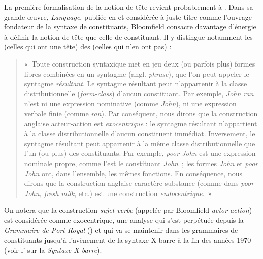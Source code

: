 {    La première formalisation de la notion de tête revient probablement à . Dans sa grande œuvre, \textit{Language}, publiée en \citeyear{bloomfield1933language} et considérée à juste titre comme l’ouvrage fondateur de la syntaxe de constituants, Bloomfield consacre davantage d’énergie à définir la notion de tête que celle de constituant. Il y distingue notamment les  (celles qui ont une tête) des  (celles qui n’en ont pas) : 
    \begin{quote}«~Toute construction syntaxique met en jeu deux (ou parfois plus) formes libres combinées en un syntagme (angl. \textit{phrase}), que l’on peut appeler le syntagme \textit{résultant}. Le syntagme résultant peut n’appartenir à la classe distributionnelle (\textit{form-class}) d’aucun constituant. Par exemple, \textit{John ran} n’est ni une expression nominative (comme \textit{John}), ni une expression verbale finie (comme \textit{ran}). Par conséquent, nous dirons que la construction anglaise acteur-action est \textit{exocentrique} : le syntagme résultant n’appartient à la classe distributionnelle d’aucun constituent immédiat. Inversement, le syntagme résultant peut appartenir à la même classe distributionnelle que l’un (ou plus) des constituants. Par exemple, \textit{poor John} est une expression nominale propre, comme l’est le constituant \textit{John~}; les formes \textit{John} et \textit{poor John} ont, dans l’ensemble, les mêmes fonctions. En conséquence, nous dirons que la construction anglaise caractère-substance (comme dans \textit{poor John, fresh milk}, etc.) est une construction \textit{endocentrique}.~» \end{quote} 
    On notera que la construction \textit{sujet-verbe} (appelée par Bloomfield \textit{actor-action}) est considérée comme exocentrique, une analyse qui s’est perpétuée depuis la \textit{Grammaire de Port Royal} (\citealt{ArnauldLancelot1660}) et qui va se maintenir dans les grammaires de constituants jusqu’à l’avènement de la syntaxe X-barre à la fin des années 1970 (voir l' sur la \textit{Syntaxe X-barre}).

}
